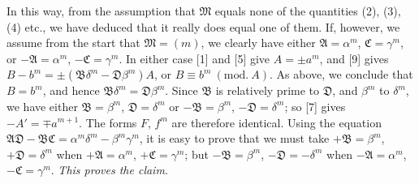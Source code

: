 In this way, from the assumption that $\mathfrak{M}$ equals none of the quantities (2), (3), (4) etc., we have deduced that it really does equal one of them. If, however, we assume from
the start that $\mathfrak{M}=(m)$, we clearly have either $\mathfrak{A}=\alpha^m$, $\mathfrak{C}=\gamma^m$, or $-\mathfrak{A}=\alpha^m$, $-\mathfrak{C}=\gamma^m$. In either case [1] and [5] give $A=\pm a^m$, and [9] gives $B-b^m=\pm(\mathfrak{B}\delta^m-\mathfrak{D}\beta^m)A$, or $B\equiv b^m\ (\mathrm{mod.}\ A)$. As above, we conclude that $B=b^m$, and hence $\mathfrak{B}\delta^m=\mathfrak{D}\beta^m$. Since $\mathfrak{B}$ is relatively prime to $\mathfrak{D}$, and $\beta^m$ to $\delta^m$, we have either $\mathfrak{B}=\beta^m$, $\mathfrak{D}=\delta^m$ or $-\mathfrak{B}=\beta^m$, $-\mathfrak{D}=\delta^m$; so [7] gives $-A'=\mp a^{m+1}$. The forms $F$, $f^m$ are therefore identical. Using the equation $\mathfrak{A}\mathfrak{D}-\mathfrak{B}\mathfrak{C}=\alpha^m\delta^m-\beta^m\gamma^m$, it is easy to prove that we must take $+\mathfrak{B}=\beta^m$, $+\mathfrak{D}=\delta^m$ when $+\mathfrak{A}=\alpha^m$, $+\mathfrak{C}=\gamma^m$; but $-\mathfrak{B}=\beta^m$, ${-\mathfrak{D}=-\delta^m}$ when $-\mathfrak{A}=\alpha^m$, $-\mathfrak{C}=\gamma^m$. \textit{This proves the claim.}

